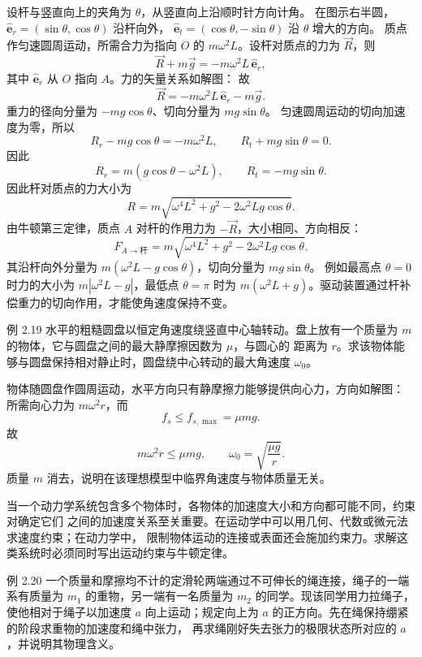 \begin{xesolution}
设杆与竖直向上的夹角为 $\theta$，从竖直向上沿顺时针方向计角。
在图示右半圆，$\hat{\boldsymbol e}_r=(\sin\theta,\cos\theta)$ 沿杆向外，
$\hat{\boldsymbol e}_t=(\cos\theta,-\sin\theta)$ 沿 $\theta$ 增大的方向。
质点作匀速圆周运动，所需合力为指向 $O$ 的
$m\omega^2L$。设杆对质点的力为 $\vec R$，则
\[
 \vec R+m\vec g=-m\omega^2L\,\hat{\boldsymbol e}_r,
\]
其中 $\hat{\boldsymbol e}_r$ 从 $O$ 指向 $A$。力的矢量关系如解图：
\soldiagTwoEighteen
故
\[
 \vec R=-m\omega^2L\,\hat{\boldsymbol e}_r-m\vec g.
\]
重力的径向分量为 $-mg\cos\theta$、切向分量为 $mg\sin\theta$。
匀速圆周运动的切向加速度为零，所以
\[
 R_r-mg\cos\theta=-m\omega^2L,\qquad R_t+mg\sin\theta=0.
\]
因此
\[
 R_r=m(g\cos\theta-\omega^2L),
 \qquad
 R_t=-mg\sin\theta.
\]
因此杆对质点的力大小为
\[
 R=m\sqrt{\omega^4L^2+g^2-2\omega^2Lg\cos\theta}.
\]
由牛顿第三定律，质点 $A$ 对杆的作用力为 $-\vec R$，大小相同、方向相反：
\[
 \boxed{F_{A\to\text{杆}}
 =m\sqrt{\omega^4L^2+g^2-2\omega^2Lg\cos\theta}}.
\]
其沿杆向外分量为 $m(\omega^2L-g\cos\theta)$，切向分量为 $mg\sin\theta$。
例如最高点 $\theta=0$ 时力的大小为 $m|\omega^2L-g|$，最低点 $\theta=\pi$ 时为
$m(\omega^2L+g)$。驱动装置通过杆补偿重力的切向作用，才能使角速度保持不变。
\end{xesolution}

\begin{origexamplebox}{例 2.19}
水平的粗糙圆盘以恒定角速度绕竖直中心轴转动。盘上放有一个质量为 $m$ 的物体，它与圆盘之间的最大静摩擦因数为 $\mu$，与圆心的
距离为 $r$。求该物体能够与圆盘保持相对静止时，圆盘绕中心转动的最大角速度
$\omega_0$。
\end{origexamplebox}

\begin{xesolution}
物体随圆盘作圆周运动，水平方向只有静摩擦力能够提供向心力，方向如解图：
\soldiagTwoNineteen
所需向心力为 $m\omega^2r$，而
\[
 f_s\le f_{s,\max}=\mu mg.
\]
故
\[
 m\omega^2r\le\mu mg,
 \qquad
 \boxed{\omega_0=\sqrt{\frac{\mu g}{r}}}.
\]
质量 $m$ 消去，说明在该理想模型中临界角速度与物体质量无关。
\end{xesolution}

当一个动力学系统包含多个物体时，各物体的加速度大小和方向都可能不同，约束对确定它们
之间的加速度关系至关重要。在运动学中可以用几何、代数或微元法求速度约束；在动力学中，
限制物体运动的连接或表面还会施加约束力。求解这类系统时必须同时写出运动约束与牛顿定律。

\begin{origexamplebox}{例 2.20}
一个质量和摩擦均不计的定滑轮两端通过不可伸长的绳连接，绳子的一端系有质量为 $m_1$
的重物，另一端有一名质量为 $m_2$ 的同学。现该同学用力拉绳子，使他相对于绳子以加速度
$a$ 向上运动；规定向上为 $a$ 的正方向。先在绳保持绷紧的阶段求重物的加速度和绳中张力，
再求绳刚好失去张力的极限状态所对应的 $a$，并说明其物理含义。
\end{origexamplebox}

